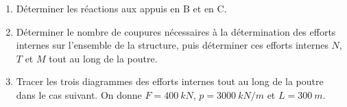 \documentclass[lecture.tex]{subfiles}
\begin{document}
\begin{description}
\begin{center}
  \end{center}
  \begin{enumerate}
    \item Déterminer les réactions aux appuis en B et en C.
    \item Déterminer le nombre de coupures nécessaires à la détermination des efforts internes sur l’ensemble de la structure, puis déterminer ces efforts internes $N$, $T$ et $M$ tout au long de la poutre.
    \item Tracer les trois diagrammes des efforts internes tout au long de la poutre dans le cas suivant. On donne $F = 400 \ kN$, $p = 3000 \ kN/m$ et $L = 300 \ m$.
  \end{enumerate}
\end{description}

\finexercice
\end{document}
